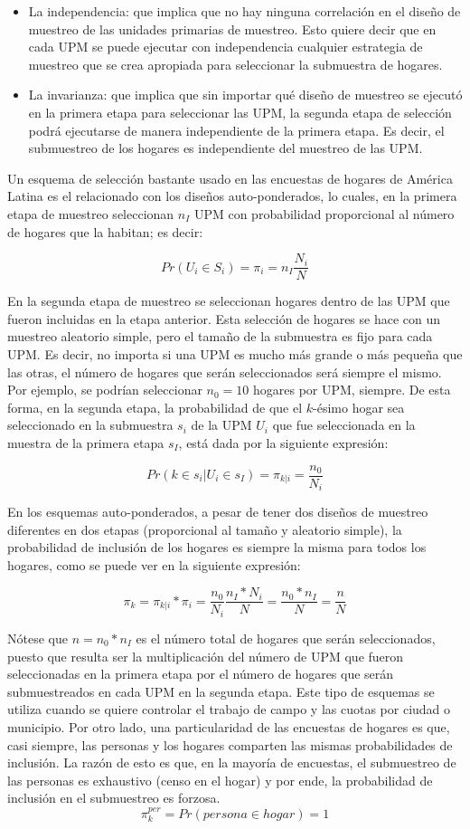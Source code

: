 \documentclass[
  12pt,
  spanish,
]{book}
\providecommand{\tightlist}{%
  \setlength{\itemsep}{0pt}\setlength{\parskip}{0pt}}
\begin{document}
\begin{itemize}
\tightlist
\item
  La independencia: que implica que no hay ninguna correlación en el diseño de muestreo de las unidades primarias de muestreo. Esto quiere decir que en cada UPM se puede ejecutar con independencia cualquier estrategia de muestreo que se crea apropiada para seleccionar la submuestra de hogares.
\item
  La invarianza: que implica que sin importar qué diseño de muestreo se ejecutó en la primera etapa para seleccionar las UPM, la segunda etapa de selección podrá ejecutarse de manera independiente de la primera etapa. Es decir, el submuestreo de los hogares es independiente del muestreo de las UPM.
\end{itemize}

Un esquema de selección bastante usado en las encuestas de hogares de América Latina es el relacionado con los diseños auto-ponderados, lo cuales, en la primera etapa de muestreo seleccionan \(n_I\) UPM con probabilidad proporcional al número de hogares que la habitan; es decir:

\[Pr(U_i \in S_i) = \pi_i = n_I \frac{N_i}{N}\]

En la segunda etapa de muestreo se seleccionan hogares dentro de las UPM que fueron incluidas en la etapa anterior. Esta selección de hogares se hace con un muestreo aleatorio simple, pero el tamaño de la submuestra es fijo para cada UPM. Es decir, no importa si una UPM es mucho más grande o más pequeña que las otras, el número de hogares que serán seleccionados será siempre el mismo. Por ejemplo, se podrían seleccionar \(n_0 = 10\) hogares por UPM, siempre. De esta forma, en la segunda etapa, la probabilidad de que el \(k\)-ésimo hogar sea seleccionado en la submuestra \(s_i\) de la UPM \(U_i\) que fue seleccionada en la muestra de la primera etapa \(s_I\), está dada por la siguiente expresión:

\[Pr(k \in s_i | U_i \in s_I ) = \pi_{k|i} = \frac{n_0}{N_i}\]

En los esquemas auto-ponderados, a pesar de tener dos diseños de muestreo diferentes en dos etapas (proporcional al tamaño y aleatorio simple), la probabilidad de inclusión de los hogares es siempre la misma para todos los hogares, como se puede ver en la siguiente expresión:

\[\pi_k = \pi_{k|i} * \pi_i = \frac{n_0}{N_i} \frac{n_I* N_i}{N} = \frac{n_0*n_I}{N} = \frac{n}{N}\]

Nótese que \(n = n_0 * n_I\) es el número total de hogares que serán seleccionados, puesto que resulta ser la multiplicación del número de UPM que fueron seleccionadas en la primera etapa por el número de hogares que serán submuestreados en cada UPM en la segunda etapa. Este tipo de esquemas se utiliza cuando se quiere controlar el trabajo de campo y las cuotas por ciudad o municipio. Por otro lado, una particularidad de las encuestas de hogares es que, casi siempre, las personas y los hogares comparten las mismas probabilidades de inclusión. La razón de esto es que, en la mayoría de encuestas, el submuestreo de las personas es exhaustivo (censo en el hogar) y por ende, la probabilidad de inclusión en el submuestreo es forzosa.
\[\pi_k^{per} = Pr(persona \in hogar) =  1\]
\end{document}
